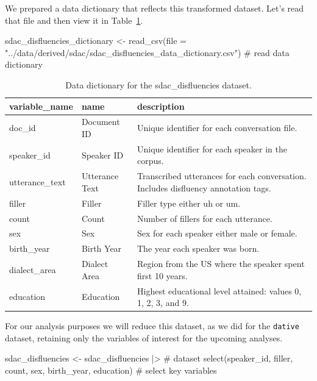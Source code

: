 \documentclass[
  letterpaper,
]{latex/krantz}
\newenvironment{Shaded}{\begin{snugshade}}{\end{snugshade}}
\newcommand{\AttributeTok}[1]{\textcolor[rgb]{0.40,0.45,0.13}{#1}}
\newcommand{\CommentTok}[1]{\textcolor[rgb]{0.37,0.37,0.37}{#1}}
\newcommand{\FunctionTok}[1]{\textcolor[rgb]{0.28,0.35,0.67}{#1}}
\newcommand{\NormalTok}[1]{\textcolor[rgb]{0.00,0.23,0.31}{#1}}
\newcommand{\OtherTok}[1]{\textcolor[rgb]{0.00,0.23,0.31}{#1}}
\newcommand{\SpecialCharTok}[1]{\textcolor[rgb]{0.37,0.37,0.37}{#1}}
\newcommand{\StringTok}[1]{\textcolor[rgb]{0.13,0.47,0.30}{#1}}
\begin{document}
We prepared a data dictionary that reflects this transformed dataset.
Let's read that file and then view it in
Table~\ref{tbl-i-sdac-disfluencies-dictionary}.

\begin{Shaded}
\begin{Highlighting}[]
\NormalTok{sdac\_disfluencies\_dictionary }\OtherTok{\textless{}{-}} \FunctionTok{read\_csv}\NormalTok{(}\AttributeTok{file =} \StringTok{"../data/derived/sdac/sdac\_disfluencies\_data\_dictionary.csv"}\NormalTok{) }\CommentTok{\# read data dictionary}
\end{Highlighting}
\end{Shaded}

\hypertarget{tbl-i-sdac-disfluencies-dictionary}{}
\begin{table}
\caption{\label{tbl-i-sdac-disfluencies-dictionary}Data dictionary for the sdac\_disfluencies dataset. }\tabularnewline

\centering
\begin{tabular}{lll}
\toprule
variable\_name & name & description\\
\midrule
doc\_id & Document ID & Unique identifier for each conversation file.\\
speaker\_id & Speaker ID & Unique identifier for each speaker in the corpus.\\
utterance\_text & Utterance Text & Transcribed utterances for each conversation. Includes disfluency annotation tags.\\
filler & Filler & Filler type either uh or um.\\
count & Count & Number of fillers for each utterance.\\
\addlinespace
sex & Sex & Sex for each speaker either male or female.\\
birth\_year & Birth Year & The year each speaker was born.\\
dialect\_area & Dialect Area & Region from the US where the speaker spent first 10 years.\\
education & Education & Highest educational level attained: values 0, 1, 2, 3, and 9.\\
\bottomrule
\end{tabular}
\end{table}

For our analysis purposes we will reduce this dataset, as we did for the
\texttt{dative} dataset, retaining only the variables of interest for
the upcoming analyses.

\begin{Shaded}
\begin{Highlighting}[]
\NormalTok{sdac\_disfluencies }\OtherTok{\textless{}{-}} 
\NormalTok{  sdac\_disfluencies }\SpecialCharTok{|\textgreater{}} \CommentTok{\# dataset}
  \FunctionTok{select}\NormalTok{(speaker\_id, filler, count, sex, birth\_year, education) }\CommentTok{\# select key variables}
\end{Highlighting}
\end{Shaded}
\end{document}
